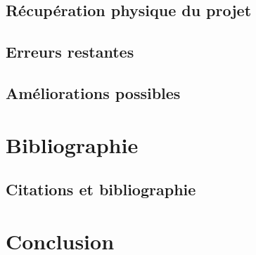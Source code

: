 \documentclass[
    iai, %
    il, %
]{heig-tb}
\begin{document}
\section{Récupération physique du projet}

\section{Erreurs restantes}

\section{Améliorations possibles}

\chapter{Bibliographie}
\section{Citations et bibliographie}




\chapter{Conclusion}

\end{document}
